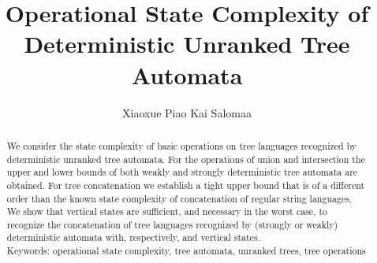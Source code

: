 \documentclass[copyright]{eptcs}
\begin{document}
\def\bbbn{{\rm I\!N}} \newcommand{\latex}{\LaTeX}
\newcommand{\tex}{\TeX}
\newcommand{\set}[1]{\{#1\}}
\newcommand{\flor}[1]{\lfloor{#1}\rfloor}

\def \prend{\vrule depth-1pt height7pt width6pt}
\def \proof{\bigbreak\noindent{\bf Proof.\ \ }}
\def \endpf{{\ \ \prend \medbreak}}

\def\vs{\vspace{1mm}}

\newtheorem{theorem}{T\/heorem}[section]
\newtheorem{apptheo}{T\/heorem}[section]
\newtheorem{corollary}{Corollary}[section]
\newtheorem{definition}{Definition}[section]
\newtheorem{lemma}{Lemma}[section]
\newtheorem{applem}{Lemma}[section]
\newtheorem{example}{Example}[section]
    \newtheorem{appexample}{Example}[section]
\newtheorem{fact}{Fact}[section]
\newtheorem{claim}{Claim}[section]
\newtheorem{proposition}{Proposition}
\newtheorem{remark}{Remark}[section]
\newcommand{\propersubset}{\subset}
\newtheorem{problem}{Open problem}

\title{Operational State Complexity of\\
  Deterministic Unranked Tree Automata}


\author{Xiaoxue Piao \qquad\qquad Kai Salomaa
}
\def\titlerunning{Unranked Tree Automata}
\def\authorrunning{X. Piao \& K. Salomaa}


\maketitle

\begin{abstract}
    We consider  the state complexity of
basic operations on tree languages recognized by
deterministic unranked
     tree automata.
     For the operations of
     union and intersection the
upper and lower bounds of both weakly and strongly
 deterministic
     tree automata are obtained.
For tree concatenation we establish a tight upper bound that
is of a different order than the known state complexity
of concatenation of regular string languages.
We show that 
     vertical states are sufficient, and
necessary in the worst case, to recognize the concatenation
of tree languages recognized by  (strongly or
weakly) deterministic automata with, respectively,
      and  vertical states.\\
Keywords:
     operational state complexity, tree automata,
     unranked trees, tree operations
\end{abstract}
\end{document}
